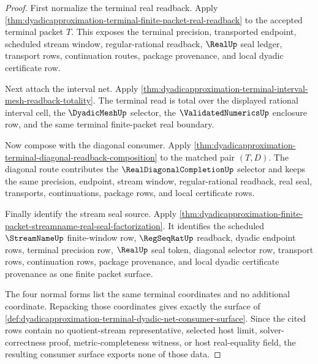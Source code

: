 \begin{proof}
First normalize the terminal real readback. Apply
\autoref{thm:dyadicapproximation-terminal-finite-packet-real-readback} to the
accepted terminal packet $T$. This exposes the terminal precision, transported
endpoint, scheduled stream window, regular-rational readback, $\RealUp$ seal
ledger, transport rows, continuation routes, package provenance, and local
dyadic certificate row.

Next attach the interval net. Apply
\autoref{thm:dyadicapproximation-terminal-interval-mesh-readback-totality}.
The terminal read is total over the displayed rational interval cell, the
$\DyadicMeshUp$ selector, the $\ValidatedNumericsUp$ enclosure row, and the
same terminal finite-packet real boundary.

Now compose with the diagonal consumer. Apply
\autoref{thm:dyadicapproximation-terminal-diagonal-readback-composition} to
the matched pair $(T,D)$. The diagonal route contributes the
$\RealDiagonalCompletionUp$ selector and keeps the same precision, endpoint,
stream window, regular-rational readback, real seal, transports,
continuations, package rows, and local certificate rows.

Finally identify the stream seal source. Apply
\autoref{thm:dyadicapproximation-finite-packet-streamname-real-seal-factorization}.
It identifies the scheduled $\StreamNameUp$ finite-window row,
$\RegSeqRatUp$ readback, dyadic endpoint rows, terminal precision row,
$\RealUp$ seal token, diagonal selector row, transport rows, continuation
rows, package provenance, and local dyadic certificate provenance as one
finite packet surface.

The four normal forms list the same terminal coordinates and no additional
coordinate. Repacking those coordinates gives exactly the surface of
\autoref{def:dyadicapproximation-terminal-dyadic-net-consumer-surface}. Since
the cited rows contain no quotient-stream representative, selected host
limit, solver-correctness proof, metric-completeness witness, or host
real-equality field, the resulting consumer surface exports none of those
data.
\end{proof}
